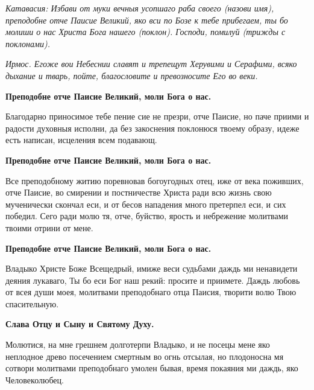 \itshape Катавасия:\normalfont{} Избави от муки вечныя усопшаго раба своего (\itshape назови имя\normalfont{}), преподобне отче Паисие Великий, яко вси по Бозе к тебе прибегаем, ты бо молиши о нас Христа Бога нашего (\itshape поклон\normalfont{}). Господи, помилуй (\itshape трижды с поклонами\normalfont{}). 











\itshape Ирмос.\normalfont{} Егоже вои Небеснии славят и трепещут Херувими и Серафими, всяко дыхание и тварь, пойте, благословите и превозносите Его во веки. 




\bfseries Преподобне отче Паисие Великий, моли Бога о нас.\normalfont{}


Благодарно приносимое тебе пение сие не презри, отче Паисие, но паче приими и радости духовныя исполни, да без закоснения поклонюся твоему образу, идеже есть написан, исцеления всем подавающ. 




\bfseries Преподобне отче Паисие Великий, моли Бога о нас.\normalfont{}


Все преподобному житию поревновав богоугодных отец, иже от века поживших, отче Паисие, во смирении и постничестве Христа ради всю жизнь свою мученически скончал еси, и от бесов нападения много претерпел еси, и сих победил. Сего ради молю тя, отче, буйство, ярость и небрежение молитвами твоими отрини от мене. 




\bfseries Преподобне отче Паисие Великий, моли Бога о нас.\normalfont{}


Владыко Христе Боже Всещедрый, имиже веси судьбами даждь ми ненавидети деяния лукаваго, Ты бо еси Бог наш рекий: просите и приимете. Даждь любовь от всея души моея, молитвами преподобнаго отца Паисия, творити волю Твою спасительную. 




\bfseries Слава Отцу и Сыну и Святому Духу.\normalfont{} 




Молютися, на мне грешнем долготерпи Владыко, и не посецы мене яко неплодное древо посечением смертным во огнь отсылая, но плодоносна мя сотвори молитвами преподобнаго умолен бывая, время покаяния ми даждь, яко Человеколюбец. 





